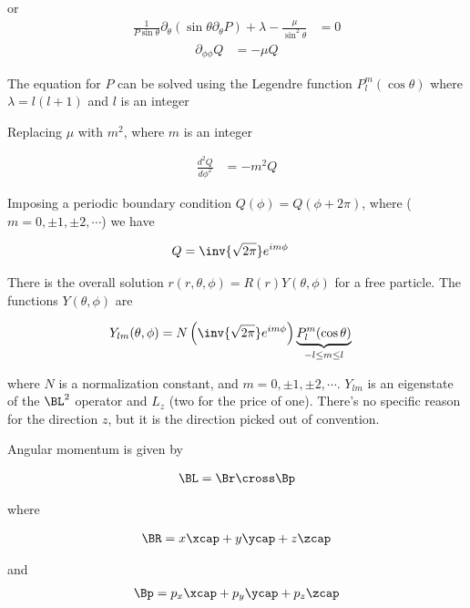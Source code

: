 or
\begin{align}\label{eqn:PHY356F:1000}
\frac{1}{P \sin\theta} \partial_\theta (\sin\theta \partial_\theta P) +\lambda -\frac{\mu}{\sin^2\theta} &= 0
\end{align}
\begin{align}\label{eqn:PHY356F:2000}
\partial_{\phi\phi} Q &= -\mu Q
\end{align}

The equation for $P$ can be solved using the Legendre function $P_l^m(\cos\theta)$ where $\lambda = l(l+1)$ and $l$ is an integer

Replacing $\mu$ with $m^2$, where $m$ is an integer

\begin{align*}
\frac{d^2 Q}{d\phi^2} &= -m^2 Q
\end{align*}

Imposing a periodic boundary condition $Q(\phi) = Q(\phi + 2\pi)$, where ($m = 0, \pm 1, \pm 2, \cdots$) we have

\begin{align*}
Q &= \inv{\sqrt{2\pi}} e^{im\phi}
\end{align*}

There is the overall solution $r(r,\theta,\phi) = R(r) Y(\theta, \phi)$ for a free particle.  The functions $Y(\theta, \phi)$ are

\begin{align*}
Y_{lm}(\theta, \phi) 
&= N \left( \inv{\sqrt{2\pi}} e^{im\phi} \right) \underbrace{ P_l^m(\cos\theta) }_{ -l \le m \le l }
\end{align*}

where $N$ is a normalization constant, and $m = 0, \pm 1, \pm 2, \cdots$.  $Y_{lm}$ is an eigenstate of the $\BL^2$ operator and $L_z$ (two for the price of one).  There's no specific reason for the direction $z$, but it is the direction picked out of convention.

Angular momentum is given by 

\begin{align*}
\BL = \Br \cross \Bp
\end{align*}

where 

\begin{align*}
\BR = x \xcap + y\ycap + z\zcap
\end{align*}

and 
\begin{align*}
\Bp = p_x \xcap + p_y\ycap + p_z\zcap
\end{align*}

